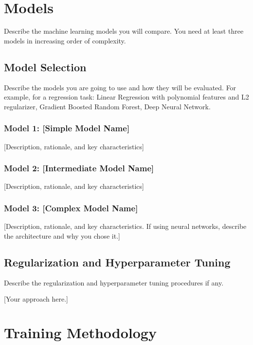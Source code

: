 \documentclass[aps,prl,preprint,groupedaddress]{revtex4-2}
\begin{document}
\section{Models}
\label{sec:models}

Describe the machine learning models you will compare. You need at least three models in increasing order of complexity.

\subsection{Model Selection}
Describe the models you are going to use and how they will be evaluated. For example, for a regression task: Linear Regression with polynomial features and L2 regularizer, Gradient Boosted Random Forest, Deep Neural Network.

\subsubsection{Model 1: [Simple Model Name]}
[Description, rationale, and key characteristics]

\subsubsection{Model 2: [Intermediate Model Name]}
[Description, rationale, and key characteristics]

\subsubsection{Model 3: [Complex Model Name]}
[Description, rationale, and key characteristics. If using neural networks, describe the architecture and why you chose it.]

\subsection{Regularization and Hyperparameter Tuning}
Describe the regularization and hyperparameter tuning procedures if any.

[Your approach here.]

\section{Training Methodology}
\label{sec:training}
\end{document}

